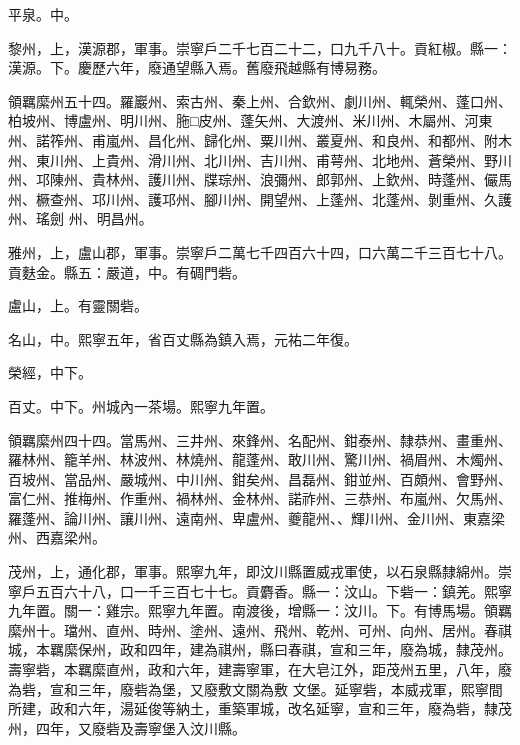 \begin{pinyinscope}
 平泉。中。



 黎州，上，漢源郡，軍事。崇寧戶二千七百二十二，口九千八十。貢紅椒。縣一：漢源。下。慶歷六年，廢通望縣入焉。舊廢飛越縣有博易務。



 領羈縻州五十四。羅巖州、索古州、秦上州、合欽州、劇川州、輒榮州、蓬口州、柏坡州、博盧州、明川州、胣□皮州、蓬矢州、大渡州、米川州、木屬州、河東州、諾筰州、甫嵐州、昌化州、歸化州、粟川州、叢夏州、和良州、和都州、附木州、東川州、上貴州、滑川州、北川州、吉川州、甫萼州、北地州、蒼榮州、野川州、邛陳州、貴林州、護川州、牒琮州、浪彌州、郎郭州、上欽州、時蓬州、儼馬州、橛查州、邛川州、護邛州、腳川州、開望州、上蓬州、北蓬州、剝重州、久護州、瑤劍
 州、明昌州。



 雅州，上，盧山郡，軍事。崇寧戶二萬七千四百六十四，口六萬二千三百七十八。貢麩金。縣五：嚴道，中。有碉門砦。



 盧山，上。有靈關砦。



 名山，中。熙寧五年，省百丈縣為鎮入焉，元祐二年復。



 榮經，中下。



 百丈。中下。州城內一茶場。熙寧九年置。



 領羈縻州四十四。當馬州、三井州、來鋒州、名配州、鉗泰州、隸恭州、畫重州、羅林州、籠羊州、林波州、林燒州、龍蓬州、敢川州、驚川州、禍眉州、木燭州、百坡州、當品州、嚴城州、中川州、鉗矣州、昌磊州、鉗並州、百頗州、會野州、富仁州、推梅州、作重州、禍林州、金林州、諾祚州、三恭州、布嵐州、欠馬州、羅蓬州、論川州、讓川州、遠南州、卑盧州、夔龍州、、輝川州、金川州、東嘉梁州、西嘉梁州。



 茂州，上，通化郡，軍事。熙寧九年，即汶川縣置威戎軍使，以石泉縣隸綿州。崇寧戶五百六十八，口一千三百七十七。貢麝香。縣一：汶山。下砦一：鎮羌。熙寧九年置。關一：雞宗。熙寧九年置。南渡後，增縣一：汶川。下。有博馬場。領羈縻州十。璫州、直州、時州、塗州、遠州、飛州、乾州、可州、向州、居州。春祺城，本羈縻保州，政和四年，建為祺州，縣曰春祺，宣和三年，廢為城，隸茂州。壽寧砦，本羈縻直州，政和六年，建壽寧軍，在大皂江外，距茂州五里，八年，廢為砦，宣和三年，廢砦為堡，又廢敷文關為敷
 文堡。延寧砦，本威戎軍，熙寧間所建，政和六年，湯延俊等納土，重築軍城，改名延寧，宣和三年，廢為砦，隸茂州，四年，又廢砦及壽寧堡入汶川縣。




\end{pinyinscope}
